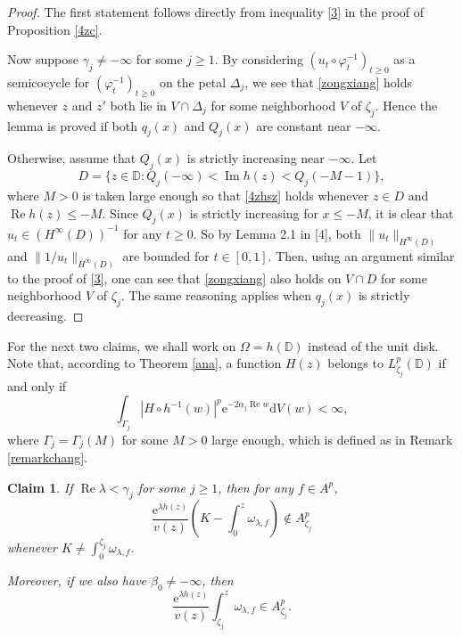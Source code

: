 \documentclass{amsart}
\theoremstyle{proclaim}
\newtheorem{claim}[theorem]{Claim}
\theoremstyle{fancyproclaim}
\theoremstyle{definition}
\theoremstyle{fancystatement}
\numberwithin{equation}{section}
\begin{document}
\begin{proof}
The first  statement follows directly from inequality \eqref{3} in the proof of Proposition \ref{4zc}.

Now suppose $\gamma_j\ne -\infty$ for some $j\geq 1$. By considering $(u_t\circ \varphi_t^{-1})_{t\geq0}$ as a semicocycle for $(\varphi_t^{-1})_{t\geq 0}$ on the petal $\Delta_j$, we see that \eqref{zongxiang} holds whenever $z$ and $z'$ both lie in $V\cap\Delta_j$ for some neighborhood $V$ of $\zeta_j$. Hence the lemma is proved if both $q_j(x)$ and $Q_j(x)$ are constant near $-\infty$. 

Otherwise, assume that $Q_j(x)$ is strictly increasing near $-\infty$. Let 
$$D=\{z\in\mathbb{D} : Q_j(-\infty)<\operatorname{Im}h(z)<Q_j(-M-1)\},$$
where $M>0$ is taken large enough so that \eqref{4zhsz} holds whenever $z\in D$ and $\operatorname{Re}h(z)\leq -M$. 
Since $Q_j(x)$ is strictly increasing for $x\leq-M$, it is clear that $u_t\in(H^\infty(D))^{-1}$ for any $t\geq 0.$ So by Lemma 2.1 in [4],  both $\|u_t\|_{H^\infty(D)}$ and $\|1/u_t\|_{H^\infty(D)}$ are bounded for $t\in[0,1]$. Then, using an argument similar to the proof of \eqref{3}, one can see that \eqref{zongxiang} also holds on $V\cap D$ for some neighborhood $V$ of $\zeta_j$. The same reasoning applies when $q_j(x)$ is strictly decreasing.
\end{proof}




For the next two claims, we shall work on $\Omega=h(\mathbb{D})$ instead of the unit disk. Note that, according to Theorem \ref{ana}, a function $H(z)$ belongs to $L^p_{\zeta_j}(\mathbb{D})$ if and only if 
$$\int_{\Gamma_j}|H\circ h^{-1}(w)|^p \mathrm{e}^{-2\alpha_j  \operatorname{Re}w} \mathrm{d}V(w)<\infty,$$
where $\Gamma_j=\Gamma_j(M)$ for some $M>0$ large enough, which is defined as in Remark \ref{remarkchang}.



\begin{claim}\label{<j}
If $ \operatorname{Re}\lambda<\gamma_j$ for some $j\geq 1$, then for any $f\in A^p$,
$$\frac{ \mathrm{e}^{\lambda h(z)}}{v(z)}\left(K-\int_0^z\omega_{\lambda,f}\right)\notin A^p_{\zeta_j}$$
whenever $K\ne\int_0^{\zeta_j}\omega_{\lambda,f}$.

Moreover, if we also have $\beta_0\ne-\infty$, then 
$$\frac{ \mathrm{e}^{\lambda h(z)}}{v(z)}\int^z_{\zeta_j}\omega_{\lambda,f}\in A^p_{\zeta_j}.$$

\end{claim}
\end{document}
